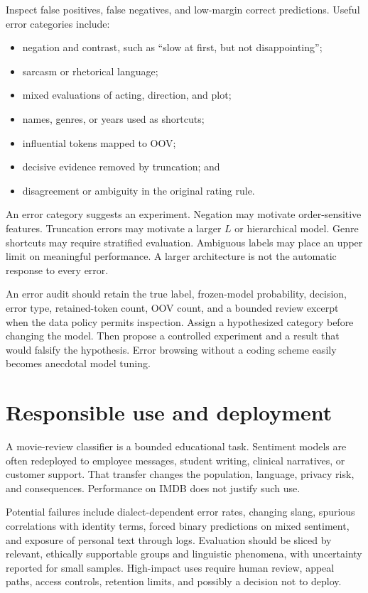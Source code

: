 Inspect false positives, false negatives, and low-margin correct predictions.
Useful error categories include:
\begin{itemize}
  \item negation and contrast, such as ``slow at first, but not disappointing'';
  \item sarcasm or rhetorical language;
  \item mixed evaluations of acting, direction, and plot;
  \item names, genres, or years used as shortcuts;
  \item influential tokens mapped to OOV;
  \item decisive evidence removed by truncation; and
  \item disagreement or ambiguity in the original rating rule.
\end{itemize}

An error category suggests an experiment. Negation may motivate order-sensitive
features. Truncation errors may motivate a larger $L$ or hierarchical model.
Genre shortcuts may require stratified evaluation. Ambiguous labels may place
an upper limit on meaningful performance. A larger architecture is not the
automatic response to every error.

\begin{professionalbox}
An error audit should retain the true label, frozen-model probability, decision,
error type, retained-token count, OOV count, and a bounded review excerpt when
the data policy permits inspection. Assign a hypothesized category before
changing the model. Then propose a controlled experiment and a result that
would falsify the hypothesis. Error browsing without a coding scheme easily
becomes anecdotal model tuning.
\end{professionalbox}

\section{Responsible use and deployment}

A movie-review classifier is a bounded educational task. Sentiment models are
often redeployed to employee messages, student writing, clinical narratives,
or customer support. That transfer changes the population, language, privacy
risk, and consequences. Performance on IMDB does not justify such use.

Potential failures include dialect-dependent error rates, changing slang,
spurious correlations with identity terms, forced binary predictions on mixed
sentiment, and exposure of personal text through logs. Evaluation should be
sliced by relevant, ethically supportable groups and linguistic phenomena,
with uncertainty reported for small samples. High-impact uses require human
review, appeal paths, access controls, retention limits, and possibly a decision
not to deploy.

